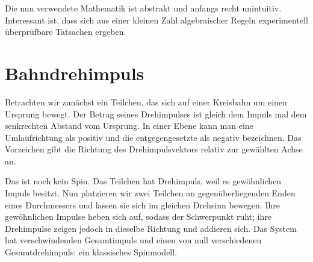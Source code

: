 \begin{classroomqa}
\end{classroomqa}

Die nun verwendete Mathematik ist abstrakt und anfangs recht unintuitiv. Interessant ist, dass sich aus einer kleinen Zahl algebraischer Regeln experimentell überprüfbare Tatsachen ergeben.

\section{Bahndrehimpuls}

Betrachten wir zunächst ein Teilchen, das sich auf einer Kreisbahn um einen Ursprung bewegt. Der Betrag seines Drehimpulses ist gleich dem Impuls mal dem senkrechten Abstand vom Ursprung. In einer Ebene kann man eine Umlaufrichtung als positiv und die entgegengesetzte als negativ bezeichnen. Das Vorzeichen gibt die Richtung des Drehimpulsvektors relativ zur gewählten Achse an.

Das ist noch kein Spin. Das Teilchen hat Drehimpuls, weil es gewöhnlichen Impuls besitzt. Nun platzieren wir zwei Teilchen an gegenüberliegenden Enden eines Durchmessers und lassen sie sich im gleichen Drehsinn bewegen. Ihre gewöhnlichen Impulse heben sich auf, sodass der Schwerpunkt ruht; ihre Drehimpulse zeigen jedoch in dieselbe Richtung und addieren sich. Das System hat verschwindenden Gesamtimpuls und einen von null verschiedenen Gesamtdrehimpuls: ein klassisches Spinmodell.

